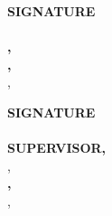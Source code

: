 \vfill
\noindent
\begin{minipage}[t]{0.45\textwidth}
  \raggedright
  \textbf{SIGNATURE}\\[0.5cm]
  \textbf{\HODName{} \HODQualification}\\
  \textbf{\HODDesignation,}\\[0.2cm]
  \textbf{\DepartmentName,}\\
  \CollegeName,\\
  \CollegeAddress
\end{minipage}%
\hfill
\begin{minipage}[t]{0.45\textwidth}
  \raggedright
  \textbf{SIGNATURE}\\[0.5cm]
  \textbf{\GuideName{} \GuideQualification}\\
  \textbf{SUPERVISOR,}\\
  \GuideDesignation,\\[0.2cm]
  \textbf{\DepartmentName,}\\
  \CollegeName,\\
  \CollegeAddress
\end{minipage}
